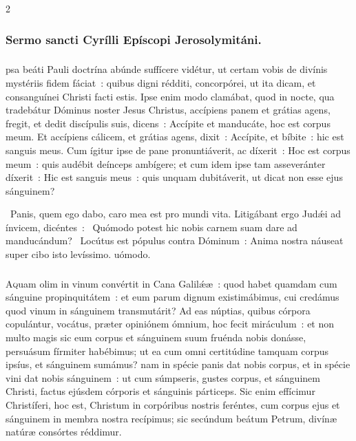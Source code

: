 \documentclass[9pt,twoside]{extarticle}
\begin{document}
\begin{multicols}{2}
\subsubsection*{\center Sermo sancti Cyrílli Epíscopi Jerosolymitáni.}
\subsubsection*{\center {}}
psa beáti Pauli doctrína abúnde suffícere vidétur, ut certam vobis de divínis mystériis fidem fáciat~: quibus digni rédditi, concorpórei, ut ita dicam, et consanguínei Christi facti estis. Ipse enim modo clamábat, quod in nocte, qua tradebátur Dóminus noster Jesus Christus, accípiens panem et grátias agens, fregit, et dedit discípulis suis, dicens~: Accípite et manducáte, hoc est corpus meum. Et accípiens cálicem, et grátias agens, dixit~: Accípite, et bíbite~: hic est sanguis meus. Cum ígitur ipse de pane pronuntiáverit, ac díxerit~: Hoc est corpus meum~: quis audébit deínceps ambígere; et cum idem ipse tam asseveránter díxerit~: Hic est sanguis meus~: quis unquam dubitáverit, ut dicat non esse ejus sánguinem?

\begin{tightlist}{}
~Panis, quem ego dabo, caro mea est pro mundi vita. Litigábant ergo Judǽi ad ínvicem, dicéntes~: \textred{*}~Quómodo potest hic nobis carnem suam dare ad manducándum? ~Locútus est pópulus contra Dóminum~: Anima nostra náuseat super cibo isto levíssimo. uómodo.
\end{tightlist}

\subsubsection*{\center {}}
\lettrine{A}quam olim in vinum convértit in Cana Galilǽæ~: quod habet quamdam cum sánguine propinquitátem~: et eum parum dignum existimábimus, cui credámus quod vinum in sánguinem transmutárit? Ad eas núptias, quibus córpora copulántur, vocátus, præter opiniónem ómnium, hoc fecit miráculum~: et non multo magis sic eum corpus et sánguinem suum fruénda nobis donásse, persuásum fírmiter habébimus; ut ea cum omni certitúdine tamquam corpus ipsíus, et sánguinem sumámus? nam in spécie panis dat nobis corpus, et in spécie vini dat nobis sánguinem~: ut cum súmpseris, gustes corpus, et sánguinem Christi, factus ejúsdem córporis et sánguinis párticeps. Sic enim effícimur Christíferi, hoc est, Christum in corpóribus nostris feréntes, cum corpus ejus et sánguinem in membra nostra recípimus; sic secúndum beátum Petrum, divínæ natúræ consórtes réddimur. 


\end{multicols}
\end{document}
